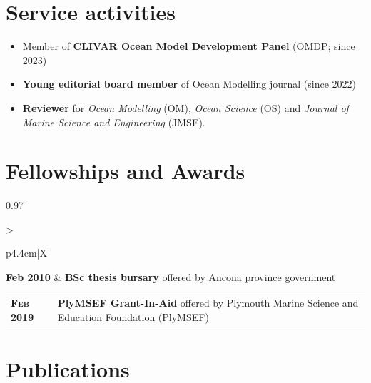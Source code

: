 \documentclass[a4paper, oneside, final]{scrartcl}
\begin{document}
\section{Service activities}
\noindent
\normalsize
\begin{itemize}
	\item Member of \textbf{CLIVAR Ocean Model Development Panel} (OMDP; since 2023)
	\item \textbf{Young editorial board member} of Ocean Modelling journal (since 2022)
	\item \textbf{Reviewer} for \textit{Ocean Modelling} (OM), \textit{Ocean Science} (OS) and \textit{Journal of Marine Science and Engineering} (JMSE).
\end{itemize}
\section{Fellowships and Awards}
\noindent
\normalsize
\begin{tabularx}{0.97\linewidth}{>{\raggedright\scshape}p{4.4cm}|X}
	\textbf{Feb 2010}  & \textbf{BSc thesis bursary} offered by Ancona province government \\
\end{tabularx}

\begin{tabularx}{0.97\linewidth}{>{\raggedright\scshape}p{4.4cm}|X}
	\textbf{Feb 2019}  & \textbf{PlyMSEF Grant-In-Aid} offered by Plymouth Marine Science and Education Foundation (PlyMSEF) \\
\end{tabularx}



\section{Publications}
\noindent
\normalsize
    
\end{document}
